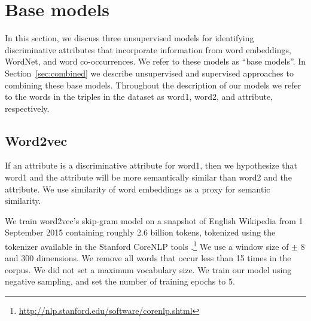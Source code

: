 \documentclass[11pt,a4paper]{article}
\newcommand{\secref}[1]{Section~\ref{#1}}
\begin{document}






  
\section{Base models} \label{individual}

In this section, we discuss three unsupervised models for identifying
discriminative attributes that incorporate information from word
embeddings, WordNet, and word co-occurrences. We refer to these models
as ``base models''. In \secref{sec:combined} we describe unsupervised
and supervised approaches to combining these base models. Throughout
the description of our models we refer to the words in the triples in
the dataset as word1, word2, and attribute, respectively.




\subsection{Word2vec\label{sec:word2vec}}

If an attribute is a discriminative attribute for word1, then we
hypothesize that word1 and the attribute will be more
semantically similar than word2 and the attribute. We use similarity
of word embeddings as a proxy for semantic similarity.

We train word2vec's skip-gram model \citep{mikolov+:2013b} on a
snapshot of English Wikipedia from 1 September 2015 containing roughly
2.6 billion tokens, tokenized using the tokenizer available in the
Stanford CoreNLP tools
\citep{manning-EtAl}.\footnote{\url{http://nlp.stanford.edu/software/corenlp.shtml}}
We use a window size of $\pm$ 8 and 300 dimensions. We remove all
words that occur less than 15 times in the corpus. We did not set a maximum vocabulary size. We train our model using negative sampling, and set the number of training epochs to 5.
\end{document}
